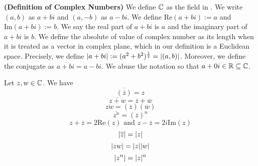 \documentclass{report}
\begin{document}
\begin{definition}
\label{1.6.2}
\textbf{(Definition of Complex Numbers)} We define $\mathbb{C}$ as the field in  . We write $(a,b)$ as $a+bi$ and $(a,-b)$ as $a-bi$. We define $\text{Re}(a+bi):=a$ and $\text{Im}(a+bi):=b$. We say the real part of  $a+bi$ is  $a$ and the imaginary part of  $a+bi$ is  $b$. We define the absolute of value of complex number as its length when it is treated as a vector in complex plane, which in our definition is a Euclidean space. Precisely, we define $|a+bi|:=(a^2+b^2)^{\frac{1}{2}}=|(a,b)|$. Moreover, we define the conjugate as  $\overline{a+bi}=a-bi$. We abuse the notation so that $a+0i\in\mathbb{R}\subseteq\mathbb{C}$. 
\end{definition}
\begin{theorem}
\label{1.6.3}
Let $z,w\in\mathbb{C}$. We have
\begin{equation}
\overline{(\overline{z})}=z
\end{equation}
\begin{equation}
\overline{z+w}=\overline{z}+\overline{w} 
\end{equation}
\begin{equation}
\overline{zw}=(\overline{z})(\overline{w})
\end{equation}
\begin{equation}
  \overline{z^n}=(\overline{z})^n
\end{equation}
\begin{equation}
z+\overline{z}=2\text{Re}(z)\text{ and }z-\overline{z}=2i\text{Im}(z)
\end{equation}
\begin{equation}
|\overline{z}|=|z|
\end{equation}
\begin{equation}
|zw|=|z||w|
\end{equation}
\begin{equation}
|z^n|=|z|^n
\end{equation}
\end{theorem}
\end{document}
